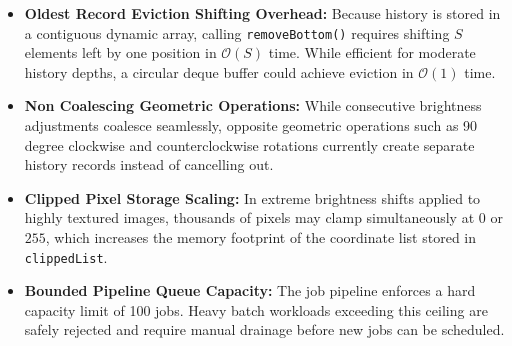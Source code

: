 \documentclass[10pt,a4paper]{article}
\begin{document}
\begin{itemize}[leftmargin=1.2em,noitemsep,topsep=2pt,parsep=1pt]
    \item \textbf{Oldest Record Eviction Shifting Overhead:} Because history is stored in a contiguous dynamic array, calling \texttt{removeBottom()} requires shifting $S$ elements left by one position in $\mathcal{O}(S)$ time. While efficient for moderate history depths, a circular deque buffer could achieve eviction in $\mathcal{O}(1)$ time.
    \item \textbf{Non Coalescing Geometric Operations:} While consecutive brightness adjustments coalesce seamlessly, opposite geometric operations such as 90 degree clockwise and counterclockwise rotations currently create separate history records instead of cancelling out.
    \item \textbf{Clipped Pixel Storage Scaling:} In extreme brightness shifts applied to highly textured images, thousands of pixels may clamp simultaneously at $0$ or $255$, which increases the memory footprint of the coordinate list stored in \texttt{clippedList}.
    \item \textbf{Bounded Pipeline Queue Capacity:} The job pipeline enforces a hard capacity limit of 100 jobs. Heavy batch workloads exceeding this ceiling are safely rejected and require manual drainage before new jobs can be scheduled.
\end{itemize}
\end{document}
